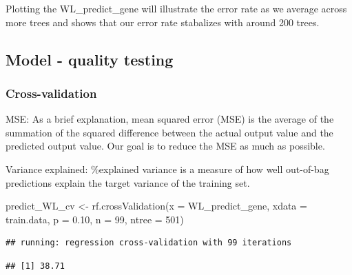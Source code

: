 \documentclass[
]{article}
\newenvironment{Shaded}{\begin{snugshade}}{\end{snugshade}}
\newcommand{\AttributeTok}[1]{\textcolor[rgb]{0.77,0.63,0.00}{#1}}
\newcommand{\DecValTok}[1]{\textcolor[rgb]{0.00,0.00,0.81}{#1}}
\newcommand{\FloatTok}[1]{\textcolor[rgb]{0.00,0.00,0.81}{#1}}
\newcommand{\FunctionTok}[1]{\textcolor[rgb]{0.00,0.00,0.00}{#1}}
\newcommand{\NormalTok}[1]{#1}
\newcommand{\OtherTok}[1]{\textcolor[rgb]{0.56,0.35,0.01}{#1}}
\newcommand{\SpecialCharTok}[1]{\textcolor[rgb]{0.00,0.00,0.00}{#1}}
\begin{document}
Plotting the WL\_predict\_gene will illustrate the error rate as we
average across more trees and shows that our error rate stabalizes with
around 200 trees.

\hypertarget{model---quality-testing}{%
\subsection{Model - quality testing}\label{model---quality-testing}}

\hypertarget{cross-validation-1}{%
\subsubsection{Cross-validation}\label{cross-validation-1}}

MSE: As a brief explanation, mean squared error (MSE) is the average of
the summation of the squared difference between the actual output value
and the predicted output value. Our goal is to reduce the MSE as much as
possible.

Variance explained: \%explained variance is a measure of how well
out-of-bag predictions explain the target variance of the training set.

\begin{Shaded}
\begin{Highlighting}[]
\NormalTok{predict\_WL\_cv }\OtherTok{\textless{}{-}} \FunctionTok{rf.crossValidation}\NormalTok{(}\AttributeTok{x =}\NormalTok{ WL\_predict\_gene, }\AttributeTok{xdata =}\NormalTok{ train.data, }
                                    \AttributeTok{p =} \FloatTok{0.10}\NormalTok{, }\AttributeTok{n =} \DecValTok{99}\NormalTok{, }\AttributeTok{ntree =} \DecValTok{501}\NormalTok{)}
\end{Highlighting}
\end{Shaded}

\begin{verbatim}
## running: regression cross-validation with 99 iterations
\end{verbatim}

\begin{Shaded}
\end{Shaded}

\begin{verbatim}
## [1] 38.71
\end{verbatim}
\end{document}
